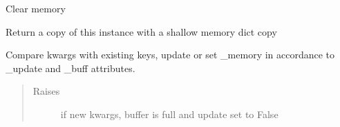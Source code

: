 \documentclass[letterpaper,10pt,english]{sphinxmanual}
\begin{document}
\begin{fulllineitems}
\begin{fulllineitems}
\begin{quote}
\begin{description}
\end{description}\end{quote}

\end{fulllineitems}


\begin{fulllineitems}
\label{\detokenize{dalio.base:dalio.base.memory.LazyRunner.clear}}
Clear memory

\end{fulllineitems}


\begin{fulllineitems}
\label{\detokenize{dalio.base:dalio.base.memory.LazyRunner.copy}}
Return a copy of this instance with a shallow memory dict copy

\end{fulllineitems}


\begin{fulllineitems}
\label{\detokenize{dalio.base:dalio.base.memory.LazyRunner.run}}
Compare kwargs with existing keys, update or set \_memory in
accordance to \_update and \_buff attributes.
\begin{quote}\begin{description}
\item[{Raises}] \leavevmode
{} \textendash{} if new kwargs, buffer is full and update set to False

\end{description}\end{quote}

\end{fulllineitems}



\end{fulllineitems}
\end{document}
